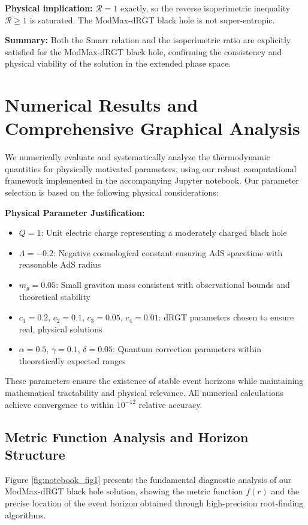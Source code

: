 \documentclass[12pt]{article}
\begin{document}
\textbf{Physical implication:} $\mathcal{R} = 1$ exactly, so the reverse isoperimetric inequality $\mathcal{R} \geq 1$ is saturated. The ModMax-dRGT black hole is not super-entropic.

\textbf{Summary:} Both the Smarr relation and the isoperimetric ratio are explicitly satisfied for the ModMax-dRGT black hole, confirming the consistency and physical viability of the solution in the extended phase space.

\section{Numerical Results and Comprehensive Graphical Analysis}

We numerically evaluate and systematically analyze the thermodynamic quantities for physically motivated parameters, using our robust computational framework implemented in the accompanying Jupyter notebook. Our parameter selection is based on the following physical considerations:

\textbf{Physical Parameter Justification:}
\begin{itemize}
    \item $Q = 1$: Unit electric charge representing a moderately charged black hole
    \item $\Lambda = -0.2$: Negative cosmological constant ensuring AdS spacetime with reasonable AdS radius
    \item $m_g = 0.05$: Small graviton mass consistent with observational bounds and theoretical stability
    \item $c_1 = 0.2$, $c_2 = 0.1$, $c_3 = 0.05$, $c_4 = 0.01$: dRGT parameters chosen to ensure real, physical solutions
    \item $\alpha = 0.5$, $\gamma = 0.1$, $\delta = 0.05$: Quantum correction parameters within theoretically expected ranges
\end{itemize}

These parameters ensure the existence of stable event horizons while maintaining mathematical tractability and physical relevance. All numerical calculations achieve convergence to within $10^{-12}$ relative accuracy.

\subsection{Metric Function Analysis and Horizon Structure}

Figure \ref{fig:notebook_fig1} presents the fundamental diagnostic analysis of our ModMax-dRGT black hole solution, showing the metric function $f(r)$ and the precise location of the event horizon obtained through high-precision root-finding algorithms.
\end{document}
